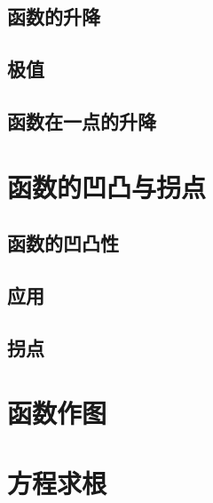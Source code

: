 \subsection{函数的升降}
\subsection{极值}
\subsection{函数在一点的升降}
\begin{exercise}

\end{exercise}
\section{函数的凹凸与拐点}
\subsection{函数的凹凸性}
\subsection{应用}
\subsection{拐点}
\begin{exercise}

\end{exercise}
\section{函数作图}
\begin{exercise}

\end{exercise}
\section{方程求根}
\begin{exercise}

\end{exercise}
\begin{exercise*}

\end{exercise*}


\endinput
